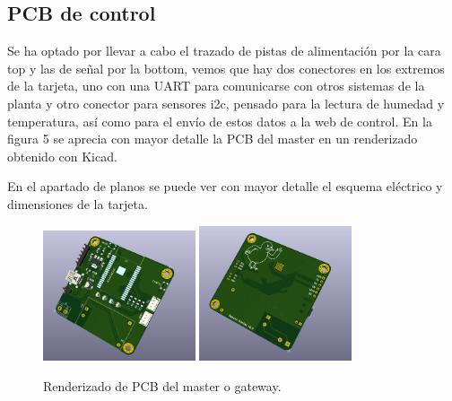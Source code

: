 \documentclass[paper=a4, fontsize=11pt,twoside]{scrartcl}	%
\begin{document}
    \subsection{PCB de control}
        Se ha optado por llevar a cabo el trazado de pistas de alimentación por la cara top y las de señal por la bottom, vemos que hay dos 
        conectores en los extremos de la tarjeta, uno con una UART para comunicarse con otros sistemas de la planta y otro conector para sensores
        i2c, pensado para la lectura de humedad y temperatura, así como para el envío de estos datos a la web de control. En la figura 5 se aprecia 
        con mayor detalle la PCB del master en un renderizado obtenido con Kicad.

        En el apartado de planos se puede ver con mayor detalle el esquema eléctrico y dimensiones de la tarjeta. 
        \begin{center}
            \begin{figure}[ht]
                \centering
                \includegraphics[width=0.4\textwidth]{../receiver_1.PNG}
                \includegraphics[width=0.4\textwidth]{../receiver_2.PNG}
                \caption{Renderizado de PCB del master o gateway.}
                \label{fig:mesh5}
            \end{figure}    
        \end{center}
\end{document}
